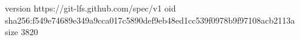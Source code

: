 version https://git-lfs.github.com/spec/v1
oid sha256:f549e74689e349a9cca017c5890def9eb48ed1cc539f0978b9f97108acb2113a
size 3820
